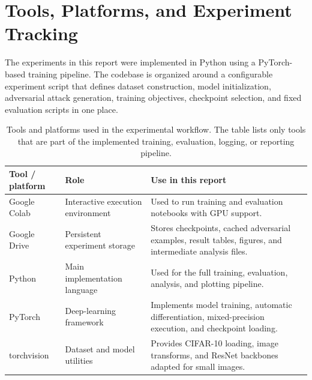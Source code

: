 \section{Tools, Platforms, and Experiment Tracking}
\label{sec:ch5_tools_platforms}

The experiments in this report were implemented in Python using a PyTorch-based
training pipeline. The codebase is organized around a configurable experiment
script that defines dataset construction, model initialization, adversarial attack
generation, training objectives, checkpoint selection, and fixed
evaluation scripts in one place. 


\begin{table}[H]
\centering
\caption[Experimental tools and platforms]{Tools and platforms used in the experimental workflow. The table lists only tools that are part of the implemented training, evaluation, logging, or reporting pipeline.}
\label{tab:ch5_tools_platforms}
\footnotesize
\setlength{\tabcolsep}{4pt}
\renewcommand{\arraystretch}{1.08}
\begin{tabularx}{\textwidth}{@{}
>{\raggedright\arraybackslash}p{}
>{\raggedright\arraybackslash}p{}
>{\raggedright\arraybackslash}X
@{}}
\toprule
Tool / platform & Role & Use in this report \\
\midrule

Google Colab
& Interactive execution environment
& Used to run training and evaluation notebooks with GPU support. \\

Google Drive
& Persistent experiment storage
& Stores checkpoints, cached adversarial examples, result tables, figures, and intermediate analysis files. \\

Python
& Main implementation language
& Used for the full training, evaluation, analysis, and plotting pipeline. \\

PyTorch
& Deep-learning framework
& Implements model training, automatic differentiation, mixed-precision execution, and checkpoint loading. \\

torchvision
& Dataset and model utilities
& Provides CIFAR-10 loading, image transforms, and ResNet backbones adapted for small images. \\


\end{tabularx}
\end{table}
